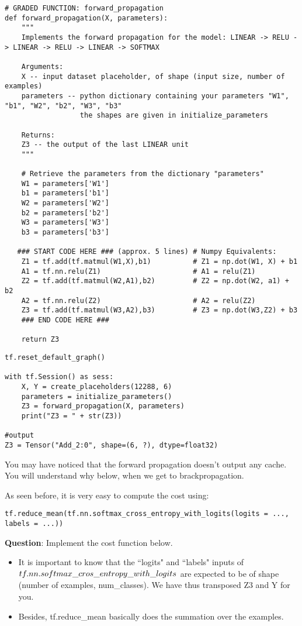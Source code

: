 \begin{verbatim}
# GRADED FUNCTION: forward_propagation
def forward_propagation(X, parameters):
    """
    Implements the forward propagation for the model: LINEAR -> RELU -> LINEAR -> RELU -> LINEAR -> SOFTMAX
    
    Arguments:
    X -- input dataset placeholder, of shape (input size, number of examples)
    parameters -- python dictionary containing your parameters "W1", "b1", "W2", "b2", "W3", "b3"
                  the shapes are given in initialize_parameters

    Returns:
    Z3 -- the output of the last LINEAR unit
    """
    
    # Retrieve the parameters from the dictionary "parameters" 
    W1 = parameters['W1']
    b1 = parameters['b1']
    W2 = parameters['W2']
    b2 = parameters['b2']
    W3 = parameters['W3']
    b3 = parameters['b3']
    
   ### START CODE HERE ### (approx. 5 lines) # Numpy Equivalents:  
    Z1 = tf.add(tf.matmul(W1,X),b1)          # Z1 = np.dot(W1, X) + b1  
    A1 = tf.nn.relu(Z1)                      # A1 = relu(Z1)  
    Z2 = tf.add(tf.matmul(W2,A1),b2)         # Z2 = np.dot(W2, a1) + b2  
    A2 = tf.nn.relu(Z2)                      # A2 = relu(Z2)  
    Z3 = tf.add(tf.matmul(W3,A2),b3)         # Z3 = np.dot(W3,Z2) + b3  
    ### END CODE HERE ###  
    
    return Z3
\end{verbatim} 


\begin{verbatim}
tf.reset_default_graph()

with tf.Session() as sess:
    X, Y = create_placeholders(12288, 6)
    parameters = initialize_parameters()
    Z3 = forward_propagation(X, parameters)
    print("Z3 = " + str(Z3))

#output
Z3 = Tensor("Add_2:0", shape=(6, ?), dtype=float32)
\end{verbatim} 


You may have noticed that the forward propagation doesn't output any cache. You will understand why below, when we get to brackpropagation.



As seen before, it is very easy to compute the cost using:
\begin{verbatim}
tf.reduce_mean(tf.nn.softmax_cross_entropy_with_logits(logits = ..., labels = ...))
\end{verbatim} 
{\textbf {Question}}: Implement the cost function below.
\begin{itemize}
\item It is important to know that the ``logits" and ``labels" inputs of $tf.nn.softmax\_cros\_\\ entropy\_with\_logits$ are expected to be of shape (number of examples, num\_classes). We have thus transposed Z3 and Y for you.
\item Besides, tf.reduce\_mean basically does the summation over the examples.
\end{itemize}

